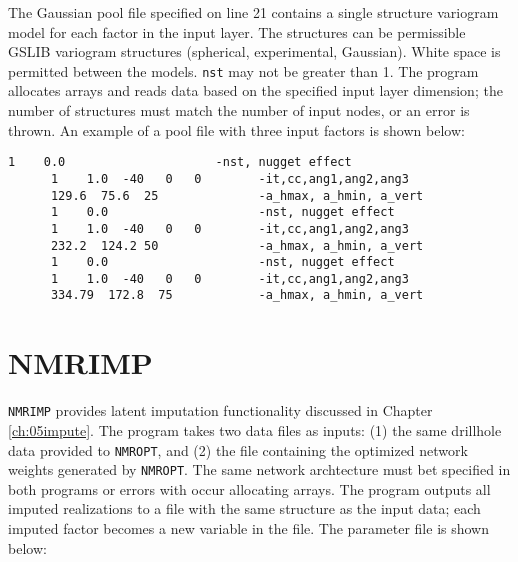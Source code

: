The Gaussian pool file specified on line 21 contains a single structure variogram model for each factor in the input layer. The structures can be permissible GSLIB variogram structures (spherical, experimental, Gaussian).  White space is permitted between the models. \texttt{nst} may not be greater than 1. The program allocates arrays and reads data based on the specified input layer dimension; the number of structures must match the number of input nodes, or an error is thrown. An example of a pool file with three input factors is shown below:

\begin{framed}
   \begin{lstlisting}[style=ccgParameterfile]
      1    0.0                     -nst, nugget effect
      1    1.0  -40   0   0        -it,cc,ang1,ang2,ang3
      129.6  75.6  25              -a_hmax, a_hmin, a_vert  
      1    0.0                     -nst, nugget effect
      1    1.0  -40   0   0        -it,cc,ang1,ang2,ang3
      232.2  124.2 50              -a_hmax, a_hmin, a_vert
      1    0.0                     -nst, nugget effect
      1    1.0  -40   0   0        -it,cc,ang1,ang2,ang3
      334.79  172.8  75            -a_hmax, a_hmin, a_vert  
   \end{lstlisting}
\end{framed}

\FloatBarrier
\section{NMRIMP}
\label{sect:Anmrimp}

\texttt{NMRIMP} provides latent imputation functionality discussed in Chapter \ref{ch:05impute}. The program takes two data files as inputs: (1) the same drillhole data provided to \texttt{NMROPT}, and (2) the file containing the optimized network weights generated by \texttt{NMROPT}. The same network archtecture must bet specified in both programs or errors with occur allocating arrays. The program outputs all imputed realizations to a file with the same structure as the input data; each imputed factor becomes a new variable in the file. The parameter file is shown below:

